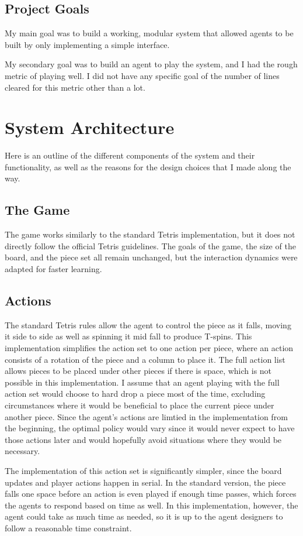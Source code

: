 \documentclass{article}
\begin{document}
\subsection{Project Goals}
My main goal was to build a working, modular system that allowed agents to be built by only implementing a simple interface.

My secondary goal was to build an agent to play the system, and I had the rough metric of playing well. I did not have any specific goal of the number of lines cleared for this metric other than a lot.

\section{System Architecture}
Here is an outline of the different components of the system and their functionality, as well as the reasons for the design choices that I made along the way.

\subsection{The Game}
The game works similarly to the standard Tetris implementation, but it does not directly follow the official Tetris guidelines. The goals of the game, the size of the board, and the piece set all remain unchanged, but the interaction dynamics were adapted for faster learning.

\subsection{Actions}
The standard Tetris rules allow the agent to control the piece as it falls, moving it side to side as well as spinning it mid fall to produce T-spins. This implementation simplifies the action set to one action per piece, where an action consists of a rotation of the piece and a column to place it. The full action list allows pieces to be placed under other pieces if there is space, which is not possible in this implementation. I assume that an agent playing with the full action set would choose to hard drop a piece most of the time, excluding circumstances where it would be beneficial to place the current piece under another piece. Since the agent's actions are limtied in the implementation from the beginning, the optimal policy would vary since it would never expect to have those actions later and would hopefully avoid situations where they would be necessary.

The implementation of this action set is significantly simpler, since the board updates and player actions happen in serial. In the standard version, the piece falls one space before an action is even played if enough time passes, which forces the agents to respond based on time as well. In this implementation, however, the agent could take as much time as needed, so it is up to the agent designers to follow a reasonable time constraint.
\end{document}
